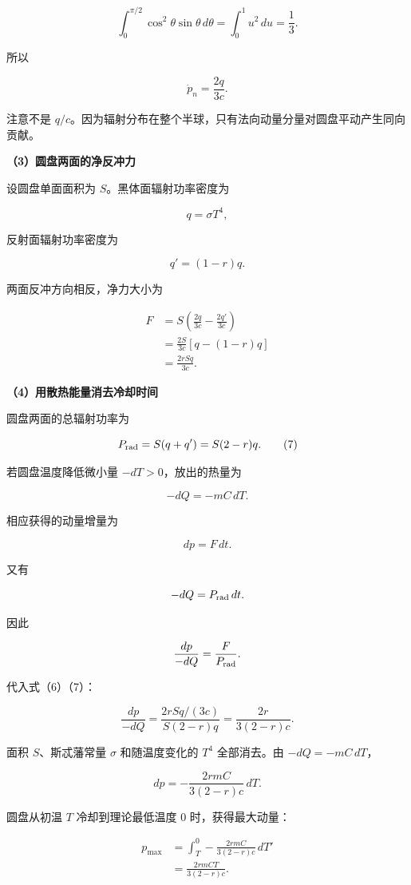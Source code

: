 \documentclass[12pt,a4paper,UTF8]{ctexart}
\begin{document}
\[
\int_0^{\pi/2}\cos^2\theta\sin\theta\,d\theta
=\int_0^1u^2\,du
=\frac13.
\]

所以

\[
\boxed{\dot p_n=\frac{2q}{3c}}.
\tag{5}
\]

注意不是
\(q/c\)。因为辐射分布在整个半球，只有法向动量分量对圆盘平动产生同向贡献。

\textbf{（3）圆盘两面的净反冲力}

设圆盘单面面积为 \(S\)。黑体面辐射功率密度为

\[
q=\sigma T^4,
\]

反射面辐射功率密度为

\[
q'=(1-r)q.
\]

两面反冲方向相反，净力大小为

\[
\begin{aligned}
F
&=S\left(\frac{2q}{3c}-\frac{2q'}{3c}\right)\\
&=\frac{2S}{3c}\left[q-(1-r)q\right]\\
&=\frac{2rSq}{3c}.
\end{aligned}
\tag{6}
\]

\textbf{（4）用散热能量消去冷却时间}

圆盘两面的总辐射功率为

\[
P_{\rm rad}=S(q+q')=S(2-r)q.
\tag{7}
\]

若圆盘温度降低微小量 \(-dT>0\)，放出的热量为

\[
-dQ=-mC\,dT.
\]

相应获得的动量增量为

\[
dp=F\,dt.
\]

又有

\[
-dQ=P_{\rm rad}\,dt.
\]

因此

\[
\frac{dp}{-dQ}=\frac{F}{P_{\rm rad}}.
\]

代入式（6）（7）：

\[
\frac{dp}{-dQ}
=\frac{2rSq/(3c)}{S(2-r)q}
=\frac{2r}{3(2-r)c}.
\tag{8}
\]

面积 \(S\)、斯忒藩常量 \(\sigma\) 和随温度变化的 \(T^4\) 全部消去。由
\(-dQ=-mC\,dT\)，

\[
dp=-\frac{2rmC}{3(2-r)c}\,dT.
\]

圆盘从初温 \(T\) 冷却到理论最低温度 \(0\) 时，获得最大动量：

\[
\begin{aligned}
p_{\max}
&=\int_T^0-\frac{2rmC}{3(2-r)c}\,dT'\\
&=\frac{2rmCT}{3(2-r)c}.
\end{aligned}
\tag{9}
\]
\end{document}
